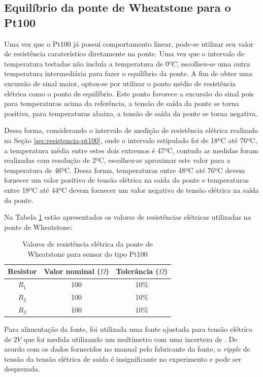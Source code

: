 \documentclass[a4paper]{instrumentacao}
\begin{document}
\subsection{Equilíbrio da ponte de Wheatstone para o Pt100}
Uma vez que o Pt100 já possui comportamento linear, pode-se utilizar seu valor de resistência caraterístico diretamente na ponte. Uma vez que o intervalo de temperatura testadas não incluía a temperatura de $0ºC$, escolheu-se uma outra temperatura intermediária para fazer o equilíbrio da ponte. A fim de obter uma excursão de sinal maior, optou-se por utilizar o ponto médio de resistência elétrica como o ponto de equilíbrio. Este ponto favorece a excursão do sinal pois para temperaturas acima da referência, a tensão de saída da ponte se torna positiva, para temperaturas abaixo, a tensão de saída da ponte se torna negativa.

Dessa forma, considerando o intervalo de medição de resistência elétrica realizado na Seção \ref{sec:resistencia-pt100}, onde o intervalo estipulado foi de 18ºC até 76ºC, a temperatura média entre estes dois extremos é 47ºC, contudo as medidas foram realizadas com resolução de 2ºC, escolheu-se aproximar este valor para a temperatura de 46ºC. Dessa forma, temperaturas entre 48ºC até 76ºC devem fornecer um valor positivo de tensão elétrica na saída da ponte e temperaturas entre 18ºC até 44ºC devem fornecer um valor negativo de tensão elétrica na saída da ponte.

Na Tabela \ref{tab:pt100-ponte-resistores} estão apresentados os valores de resistências elétricas utilizadas na ponte de Wheatstone:

\begin{table}[]
\centering
\caption{Valores de resistência elétrica da ponte de Wheatstone para sensor do tipo Pt100}
\label{tab:pt100-ponte-resistores}
\begin{tabular}{|c|c|c|}
\hline
	\textbf{Resistor} 	& \textbf{Valor nominal ($\Omega$)} 	& \textbf{Tolerância ($\Omega$)} 	\\ \hline
	$R_1$				& 100									& 10\%								\\ \hline
	$R_2$				& 100									& 10\%								\\ \hline
	$R_3$				& 100									& 10\%								\\ \hline
\end{tabular}
\end{table}

Para alimentação da fonte, foi utilizada uma fonte  ajustada para tensão elétrica de $2V$ que foi medida utilizando um multímetro  com uma incerteza de . De acordo com os dados fornecidos no manual pelo fabricante da fonte, o \textit{ripple} de tensão da tensão elétrica de saída é insignificante no experimento e pode ser desprezada.
\end{document}
